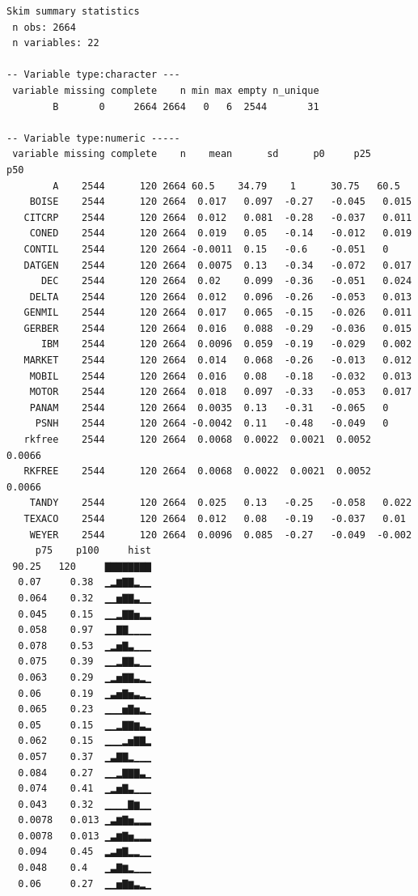 \documentclass[]{book}
\begin{document}
\begin{verbatim}
Skim summary statistics
 n obs: 2664 
 n variables: 22 

-- Variable type:character ---
 variable missing complete    n min max empty n_unique
        B       0     2664 2664   0   6  2544       31

-- Variable type:numeric -----
 variable missing complete    n    mean      sd      p0     p25     p50
        A    2544      120 2664 60.5    34.79    1      30.75   60.5   
    BOISE    2544      120 2664  0.017   0.097  -0.27   -0.045   0.015 
   CITCRP    2544      120 2664  0.012   0.081  -0.28   -0.037   0.011 
    CONED    2544      120 2664  0.019   0.05   -0.14   -0.012   0.019 
   CONTIL    2544      120 2664 -0.0011  0.15   -0.6    -0.051   0     
   DATGEN    2544      120 2664  0.0075  0.13   -0.34   -0.072   0.017 
      DEC    2544      120 2664  0.02    0.099  -0.36   -0.051   0.024 
    DELTA    2544      120 2664  0.012   0.096  -0.26   -0.053   0.013 
   GENMIL    2544      120 2664  0.017   0.065  -0.15   -0.026   0.011 
   GERBER    2544      120 2664  0.016   0.088  -0.29   -0.036   0.015 
      IBM    2544      120 2664  0.0096  0.059  -0.19   -0.029   0.002 
   MARKET    2544      120 2664  0.014   0.068  -0.26   -0.013   0.012 
    MOBIL    2544      120 2664  0.016   0.08   -0.18   -0.032   0.013 
    MOTOR    2544      120 2664  0.018   0.097  -0.33   -0.053   0.017 
    PANAM    2544      120 2664  0.0035  0.13   -0.31   -0.065   0     
     PSNH    2544      120 2664 -0.0042  0.11   -0.48   -0.049   0     
   rkfree    2544      120 2664  0.0068  0.0022  0.0021  0.0052  0.0066
   RKFREE    2544      120 2664  0.0068  0.0022  0.0021  0.0052  0.0066
    TANDY    2544      120 2664  0.025   0.13   -0.25   -0.058   0.022 
   TEXACO    2544      120 2664  0.012   0.08   -0.19   -0.037   0.01  
    WEYER    2544      120 2664  0.0096  0.085  -0.27   -0.049  -0.002 
     p75    p100     hist
 90.25   120     ▇▇▇▇▇▇▇▇
  0.07     0.38  ▁▂▆▇▇▂▁▁
  0.064    0.32  ▁▁▅▇▇▃▁▁
  0.045    0.15  ▁▁▂▇▇▅▂▂
  0.058    0.97  ▁▁▇▇▁▁▁▁
  0.078    0.53  ▁▂▅▇▃▁▁▁
  0.075    0.39  ▁▁▂▇▇▂▁▁
  0.063    0.29  ▁▂▅▇▇▃▂▁
  0.06     0.19  ▁▃▅▇▅▃▂▁
  0.065    0.23  ▁▁▁▅▇▅▂▁
  0.05     0.15  ▁▁▂▇▇▆▃▂
  0.062    0.15  ▁▁▁▂▅▇▇▂
  0.057    0.37  ▁▃▇▇▂▁▁▁
  0.084    0.27  ▁▁▂▇▇▇▃▁
  0.074    0.41  ▁▂▅▇▃▁▁▁
  0.043    0.32  ▁▁▁▁▇▆▁▁
  0.0078   0.013 ▁▃▆▇▅▂▂▂
  0.0078   0.013 ▁▃▆▇▅▂▂▂
  0.094    0.45  ▂▃▆▇▂▂▁▁
  0.048    0.4   ▁▃▇▆▂▁▁▁
  0.06     0.27  ▁▁▅▇▆▃▂▁
\end{verbatim}
\end{document}
